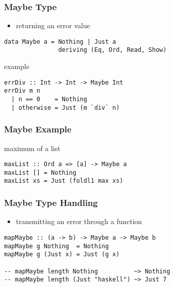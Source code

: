\documentclass[dvipsnames]{beamer}
\theoremstyle{plain}
\begin{document}
\begin{frame}[fragile]
  \frametitle{Maybe Type}

  \begin{itemize}
    \item returning an error value
  \end{itemize}

  \begin{lstlisting}
data Maybe a = Nothing | Just a
               deriving (Eq, Ord, Read, Show)
  \end{lstlisting}

  \begin{exampleblock}{example}
    \begin{lstlisting}
errDiv :: Int -> Int -> Maybe Int
errDiv m n
  | n == 0    = Nothing
  | otherwise = Just (m `div` n)
    \end{lstlisting}
  \end{exampleblock}
\end{frame}

\begin{frame}[fragile]
  \frametitle{Maybe Example}

  \begin{exampleblock}{maximum of a list}
    \begin{lstlisting}
maxList :: Ord a => [a] -> Maybe a
maxList [] = Nothing
maxList xs = Just (foldl1 max xs)
    \end{lstlisting}
  \end{exampleblock}
\end{frame}

\begin{frame}[fragile]
  \frametitle{Maybe Type Handling}

  \begin{itemize}
    \item transmitting an error through a function
  \end{itemize}

  \begin{exampleblock}{}
    \begin{lstlisting}
mapMaybe :: (a -> b) -> Maybe a -> Maybe b
mapMaybe g Nothing  = Nothing
mapMaybe g (Just x) = Just (g x)

-- mapMaybe length Nothing          ~> Nothing
-- mapMaybe length (Just "haskell") ~> Just 7
    \end{lstlisting}
  \end{exampleblock}
\end{frame}
\end{document}
